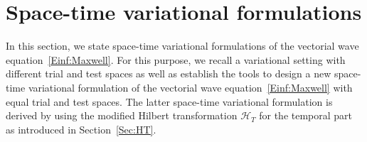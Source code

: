 \documentclass[a4paper,11pt]{article}
\begin{document}
	
\section{Space-time variational formulations}  \label{Sec:VF}
	
	In this section, we state space-time variational formulations of the vectorial wave equation~\eqref{Einf:Maxwell}.
	For this purpose, we recall a variational setting with different trial and test spaces as well as establish the tools to design a new space-time variational formulation of the vectorial wave equation~\eqref{Einf:Maxwell} with equal trial and test spaces.
	The latter space-time variational formulation is derived by using the modified Hilbert transformation $\mathcal H_T$ for the temporal part as introduced in Section~\ref{Sec:HT}.
	
\end{document}
